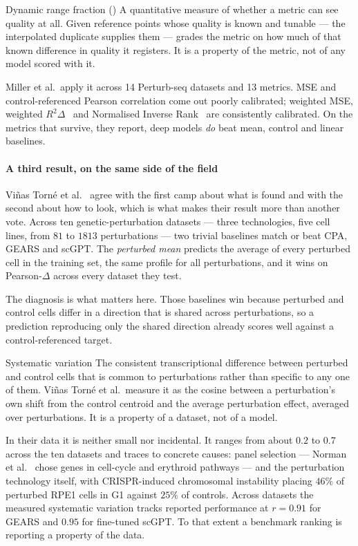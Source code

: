 \begin{defn}{Dynamic range fraction (\DRF)}
A quantitative measure of whether a metric can see quality at all. Given
reference points whose quality is known and tunable --- the interpolated
duplicate supplies them --- \DRF{} grades the metric on how much of that known
difference in quality it registers. It is a property of the metric, not of any
model scored with it.
\end{defn}

Miller et al.\ apply it across 14 Perturb-seq datasets and 13 metrics. MSE and
control-referenced Pearson correlation come out poorly calibrated; weighted MSE,
weighted $R^2\Delta$~\cite{mejia} and Normalised Inverse
Rank~\cite{perturbench} are consistently calibrated. On the metrics that survive,
they report, deep models \emph{do} beat mean, control and linear baselines.

\paragraph{A third result, on the same side of the field}
Vi\~nas Torn\'e et al.~\cite{systema} agree with the first camp about what is
found and with the second about how to look, which is what makes their result
more than another vote. Across ten genetic-perturbation datasets --- three
technologies, five cell lines, from $81$ to $\num{1813}$ perturbations --- two
trivial baselines match or beat CPA, GEARS and scGPT. The \emph{perturbed mean}
predicts the average of every perturbed cell in the training set, the same
profile for all perturbations, and it wins on Pearson-$\Delta$ across every
dataset they test.

The diagnosis is what matters here. Those baselines win because perturbed and
control cells differ in a direction that is shared across perturbations, so a
prediction reproducing only the shared direction already scores well against a
control-referenced target.

\begin{defn}{Systematic variation}
The consistent transcriptional difference between perturbed and control cells
that is common to perturbations rather than specific to any one of them. Vi\~nas
Torn\'e et al.\ measure it as the cosine between a perturbation's own shift from
the control centroid and the average perturbation effect, averaged over
perturbations. It is a property of a dataset, not of a model.
\end{defn}

In their data it is neither small nor incidental. It ranges from about $0.2$ to
$0.7$ across the ten datasets and traces to concrete causes: panel selection ---
Norman et al.~\cite{norman} chose genes in cell-cycle and erythroid pathways ---
and the perturbation technology itself, with CRISPR-induced chromosomal
instability placing $46\%$ of perturbed RPE1 cells in G1 against $25\%$ of
controls. Across datasets the measured systematic variation tracks reported
performance at $r = 0.91$ for GEARS and $0.95$ for fine-tuned scGPT. To that
extent a benchmark ranking is reporting a property of the data.

